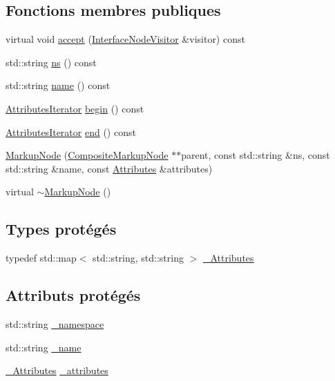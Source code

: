 \subsection*{Fonctions membres publiques}
\begin{DoxyCompactItemize}
\item 
virtual void \hyperlink{classxml_1_1_markup_node_ae70b538ce71b427c1ea552b0b41c3b34}{accept} (\hyperlink{classxml_1_1_interface_node_visitor}{InterfaceNodeVisitor} \&visitor) const 
\item 
std::string \hyperlink{classxml_1_1_markup_node_a0b5a2b37912a2957be48bbc629fc3cf9}{ns} () const 
\item 
std::string \hyperlink{classxml_1_1_markup_node_a26e3ad142b13980f2ad181ca76dfe0a9}{name} () const 
\item 
\hyperlink{classxml_1_1_markup_node_aab83830a10c767edbed9623af05e7a3c}{AttributesIterator} \hyperlink{classxml_1_1_markup_node_a48aac1f80b326393fdac05835604c69f}{begin} () const 
\item 
\hyperlink{classxml_1_1_markup_node_aab83830a10c767edbed9623af05e7a3c}{AttributesIterator} \hyperlink{classxml_1_1_markup_node_a3b63a8ea94999e2f688f6dc606f3e24b}{end} () const 
\item 
\hyperlink{classxml_1_1_markup_node_a8cc66b7a2019a38fafe0b24614ab9735}{MarkupNode} (\hyperlink{classxml_1_1_composite_markup_node}{CompositeMarkupNode} $\ast$$\ast$parent, const std::string \&ns, const std::string \&name, const \hyperlink{classxml_1_1_markup_node_ade6f6045d18042d1a87f80f308f177fb}{Attributes} \&attributes)
\item 
virtual \hyperlink{classxml_1_1_markup_node_a2067f6fd10373e45e2a98749e1384001}{$\sim$MarkupNode} ()
\end{DoxyCompactItemize}
\subsection*{Types protégés}
\begin{DoxyCompactItemize}
\item 
typedef std::map$<$ std::string, std::string $>$ \hyperlink{classxml_1_1_markup_node_a2d052c364321c4f1f506f9f17d8c8089}{\_\-Attributes}
\end{DoxyCompactItemize}
\subsection*{Attributs protégés}
\begin{DoxyCompactItemize}
\item 
std::string \hyperlink{classxml_1_1_markup_node_a18ffd5e490fc7028b580323f5892800f}{\_\-namespace}
\item 
std::string \hyperlink{classxml_1_1_markup_node_a372e14f2da008d1f2da1a5b9c8eb7600}{\_\-name}
\item 
\hyperlink{classxml_1_1_markup_node_a2d052c364321c4f1f506f9f17d8c8089}{\_\-Attributes} \hyperlink{classxml_1_1_markup_node_ada616acd43f59affa41ab7a0e6f19baf}{\_\-attributes}
\end{DoxyCompactItemize}


